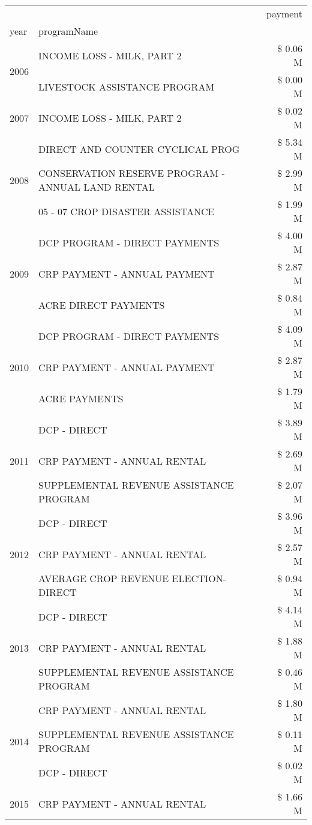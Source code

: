 \begin{tabular}{llr}
\toprule
 &  & payment \\
year & programName &  \\
\midrule
\multirow[t]{2}{*}{2006} & INCOME LOSS - MILK, PART 2 & \$ 0.06 M \\
 & LIVESTOCK ASSISTANCE PROGRAM & \$ 0.00 M \\
\cline{1-3}
2007 & INCOME LOSS - MILK, PART 2 & \$ 0.02 M \\
\cline{1-3}
\multirow[t]{3}{*}{2008} & DIRECT AND COUNTER CYCLICAL PROG & \$ 5.34 M \\
 & CONSERVATION RESERVE PROGRAM - ANNUAL LAND RENTAL & \$ 2.99 M \\
 & 05 - 07 CROP DISASTER ASSISTANCE & \$ 1.99 M \\
\cline{1-3}
\multirow[t]{3}{*}{2009} & DCP PROGRAM - DIRECT PAYMENTS & \$ 4.00 M \\
 & CRP PAYMENT - ANNUAL PAYMENT & \$ 2.87 M \\
 & ACRE DIRECT PAYMENTS & \$ 0.84 M \\
\cline{1-3}
\multirow[t]{3}{*}{2010} & DCP PROGRAM - DIRECT PAYMENTS & \$ 4.09 M \\
 & CRP PAYMENT - ANNUAL PAYMENT & \$ 2.87 M \\
 & ACRE PAYMENTS & \$ 1.79 M \\
\cline{1-3}
\multirow[t]{3}{*}{2011} & DCP - DIRECT & \$ 3.89 M \\
 & CRP PAYMENT - ANNUAL RENTAL & \$ 2.69 M \\
 & SUPPLEMENTAL REVENUE ASSISTANCE PROGRAM & \$ 2.07 M \\
\cline{1-3}
\multirow[t]{3}{*}{2012} & DCP - DIRECT & \$ 3.96 M \\
 & CRP PAYMENT - ANNUAL RENTAL & \$ 2.57 M \\
 & AVERAGE CROP REVENUE ELECTION-DIRECT & \$ 0.94 M \\
\cline{1-3}
\multirow[t]{3}{*}{2013} & DCP - DIRECT & \$ 4.14 M \\
 & CRP PAYMENT - ANNUAL RENTAL & \$ 1.88 M \\
 & SUPPLEMENTAL REVENUE ASSISTANCE PROGRAM & \$ 0.46 M \\
\cline{1-3}
\multirow[t]{3}{*}{2014} & CRP PAYMENT - ANNUAL RENTAL & \$ 1.80 M \\
 & SUPPLEMENTAL REVENUE ASSISTANCE PROGRAM & \$ 0.11 M \\
 & DCP - DIRECT & \$ 0.02 M \\
\cline{1-3}
\multirow[t]{3}{*}{2015} & CRP PAYMENT - ANNUAL RENTAL & \$ 1.66 M \\

\end{tabular}
